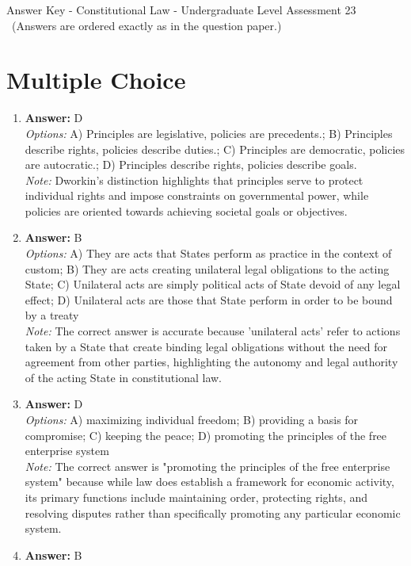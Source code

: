 \documentclass[12pt]{article}
\begin{document}
\begin{center}
Answer Key - Constitutional Law - Undergraduate Level Assessment 23 \
\small (Answers are ordered exactly as in the question paper.)
\end{center}

\section*{Multiple Choice}
\begin{enumerate}[label=\arabic*.]
\item \textbf{Answer:} D
\\ \textit{Options:} A) Principles are legislative, policies are precedents.; B) Principles describe rights, policies describe duties.; C) Principles are democratic, policies are autocratic.; D) Principles describe rights, policies describe goals.
\\ \textit{Note:} Dworkin's distinction highlights that principles serve to protect individual rights and impose constraints on governmental power, while policies are oriented towards achieving societal goals or objectives.
\item \textbf{Answer:} B
\\ \textit{Options:} A) They are acts that States perform as practice in the context of custom; B) They are acts creating unilateral legal obligations to the acting State; C) Unilateral acts are simply political acts of State devoid of any legal effect; D) Unilateral acts are those that State perform in order to be bound by a treaty
\\ \textit{Note:} The correct answer is accurate because 'unilateral acts' refer to actions taken by a State that create binding legal obligations without the need for agreement from other parties, highlighting the autonomy and legal authority of the acting State in constitutional law.
\item \textbf{Answer:} D
\\ \textit{Options:} A) maximizing individual freedom; B) providing a basis for compromise; C) keeping the peace; D) promoting the principles of the free enterprise system
\\ \textit{Note:} The correct answer is "promoting the principles of the free enterprise system" because while law does establish a framework for economic activity, its primary functions include maintaining order, protecting rights, and resolving disputes rather than specifically promoting any particular economic system.
\item \textbf{Answer:} B

\end{enumerate}
\end{document}
